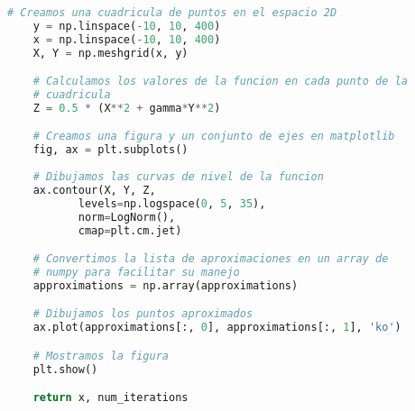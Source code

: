 \begin{enumerate}
\begin{enumerate}[\bfseries (a)]
\begin{lstlisting}[language=Python]
    # Creamos una cuadricula de puntos en el espacio 2D
    y = np.linspace(-10, 10, 400)
    x = np.linspace(-10, 10, 400)
    X, Y = np.meshgrid(x, y)

    # Calculamos los valores de la funcion en cada punto de la 
    # cuadricula
    Z = 0.5 * (X**2 + gamma*Y**2)

    # Creamos una figura y un conjunto de ejes en matplotlib
    fig, ax = plt.subplots()
    
    # Dibujamos las curvas de nivel de la funcion
    ax.contour(X, Y, Z, 
	       levels=np.logspace(0, 5, 35), 
	       norm=LogNorm(), 
	       cmap=plt.cm.jet)

    # Convertimos la lista de aproximaciones en un array de 
    # numpy para facilitar su manejo
    approximations = np.array(approximations)

    # Dibujamos los puntos aproximados
    ax.plot(approximations[:, 0], approximations[:, 1], 'ko')

    # Mostramos la figura
    plt.show()

    return x, num_iterations
\end{lstlisting}
    \end{enumerate}


\end{enumerate}
